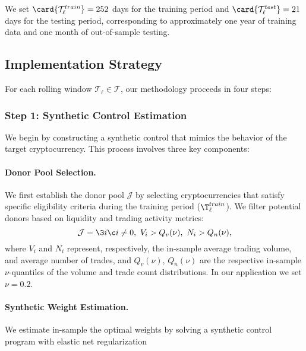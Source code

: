 We set $\card{\mathcal{T}^{train}_{\ell}} = 252$ days for the training period and $\card{\mathcal{T}^{test}_{\ell}} = 21$ days for the testing period, corresponding to approximately one year of training data and one month of out-of-sample testing. %



\subsection{Implementation Strategy}

For each rolling window $\mathcal{T}_{\ell}\in \mathcal T$, our methodology proceeds in four steps:

\subsubsection*{Step 1: Synthetic Control Estimation} 
We begin by constructing a synthetic control that mimics the behavior of the target cryptocurrency. This process involves three key components:

\paragraph{Donor Pool Selection.} We first establish the donor pool $\mathcal{J}$ by selecting cryptocurrencies that satisfy specific eligibility criteria during the training period ($\T_\ell^{train}$). We filter potential donors based on liquidity and trading activity metrics:
$$
\mathcal{J} = 
\3{i
\c
i \neq 0
,~
V_i > Q_v(\nu) 
,~
N_i > Q_n(\nu) 
}
,
$$
where $V_i$ and $N_i$ represent, respectively, the in-sample average trading volume, and average number of trades, and $Q_v(\nu)$, $Q_n(\nu)$ are the respective in-sample $\nu$-quantiles of the volume and trade count distributions. In our application we set $\nu = 0.2$.

\paragraph{Synthetic Weight Estimation.} We estimate in-sample the optimal weights by solving a synthetic control program with elastic net regularization 

